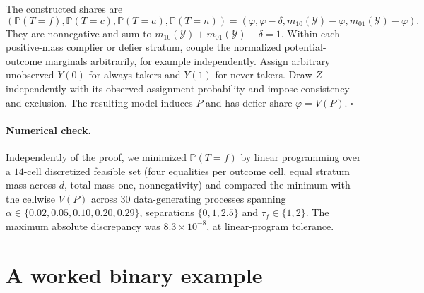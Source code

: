 \documentclass{article}
\theoremstyle{remark}
\newcommand{\Prob}{\mathbb{P}}
\newcommand{\Yspace}{\mathcal{Y}}
\begin{document}
The constructed shares are
\[
(\Prob(T=f),\Prob(T=c),\Prob(T=a),\Prob(T=n))
=(\varphi,\varphi-\delta,m_{10}(\Yspace)-\varphi,m_{01}(\Yspace)-\varphi).
\]
They are nonnegative and sum to
$m_{10}(\Yspace)+m_{01}(\Yspace)-\delta=1$.
Within each positive-mass complier or defier stratum, couple the normalized
potential-outcome marginals arbitrarily, for example independently. Assign
arbitrary unobserved $Y(0)$ for always-takers and $Y(1)$ for never-takers.
Draw $Z$ independently with its observed assignment probability and impose
consistency and exclusion. The resulting model induces $P$ and has defier
share $\varphi=V(P)$. \hfill$\square$

\paragraph{Numerical check.} Independently of the proof, we minimized $\Prob(T=f)$ by linear programming over a $14$-cell discretized feasible set (four equalities per outcome cell, equal stratum mass across $d$, total mass one, nonnegativity) and compared the minimum with the cellwise $V(P)$ across $30$ data-generating processes spanning $\alpha\in\{0.02,0.05,0.10,0.20,0.29\}$, separations $\{0,1,2.5\}$ and $\tau_f\in\{1,2\}$. The maximum absolute discrepancy was $8.3\times10^{-8}$, at linear-program tolerance.

\section{A worked binary example}\label{app:example}
\end{document}
